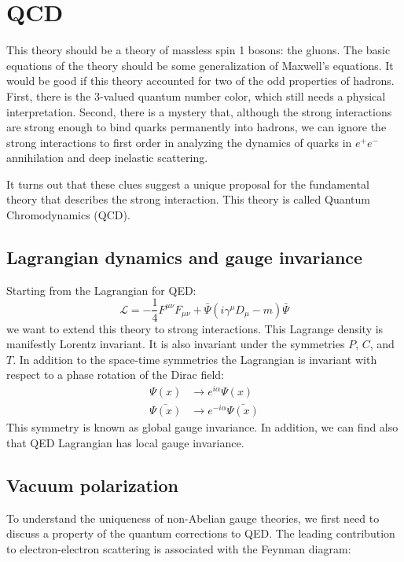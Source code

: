 \documentclass[../../main/main.tex]{subfiles}
\begin{document}

\section{QCD}
This theory should be a theory of massless spin 1 bosons: the gluons. The basic equations of the theory should be some generalization of Maxwell’s equations. It would be good if this theory accounted for two of the odd properties of hadrons. First, there is the 3-valued quantum number color, which still needs a physical interpretation. Second, there is a mystery that, although the strong interactions are strong enough to bind quarks permanently into hadrons, we can ignore the strong interactions to first order in analyzing the dynamics of quarks in \( e^+e^- \) annihilation and deep inelastic scattering.

It turns out that these clues suggest a unique proposal for the fundamental theory that describes the strong interaction. This theory is called Quantum Chromodynamics (QCD).



\subsection{Lagrangian dynamics and gauge invariance}
Starting from the Lagrangian for QED:
\begin{equation}
	\mathcal{L}
	=
	- \frac{1}{4} F^{\mu\nu} F_{\mu\nu} + \bar{\Psi}(i\gamma^{\mu}D_{\mu} - m)\bar{\Psi}
	\label{eq:}
\end{equation}
we want to extend this theory to strong interactions. This Lagrange density is manifestly Lorentz invariant. It is also invariant under the symmetries \( P \), \( C \), and \( T \). In addition to the space-time symmetries the Lagrangian is invariant with respect to a phase rotation of the Dirac field:
\begin{align}
	\Psi(x) 		&\longrightarrow e^{i\alpha} \Psi(x)	\\
	\bar{\Psi(x)} 	&\longrightarrow e^{-i\alpha} \bar{\Psi(x)}
\end{align}
This symmetry is known as global gauge invariance. In addition, we can find also that QED Lagrangian has local gauge invariance.



\subsection{Vacuum polarization}
To understand the uniqueness of non-Abelian gauge theories, we first need to discuss a property of the quantum corrections to QED. The leading contribution to electron-electron scattering is associated with the Feynman diagram:
\end{document}
